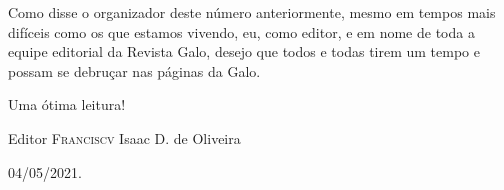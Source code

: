 Como disse o organizador deste número anteriormente, mesmo em tempos mais difíceis como os que estamos vivendo, eu, como editor, e em nome de toda a equipe editorial da Revista Galo, desejo que todos e todas tirem um tempo e possam se debruçar nas páginas da Galo.

\medskip

Uma ótima leitura!

\bigskip

Editor \textsc{Franciscv} Isaac D. de Oliveira

\bigskip

\hfill 04/05/2021.